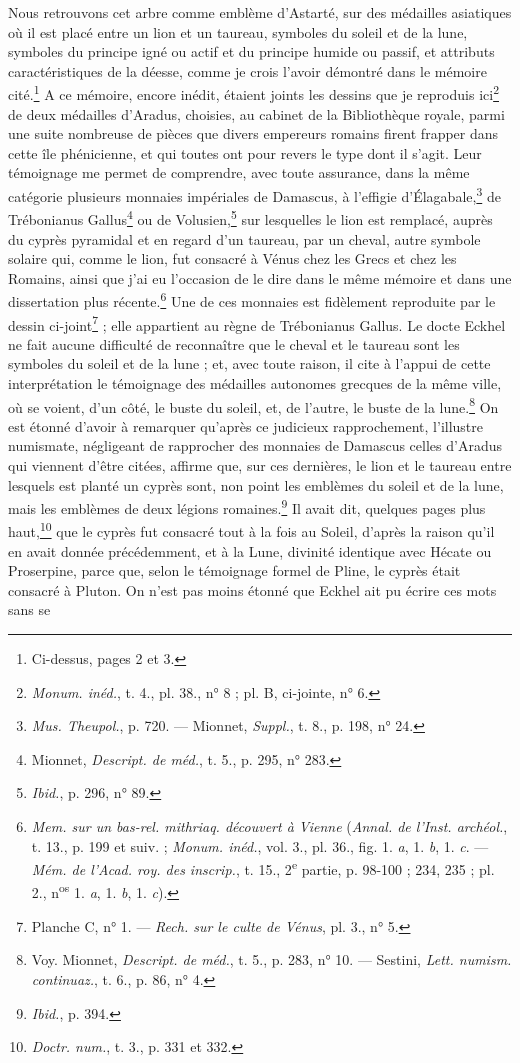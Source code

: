 \documentclass[a4paper, 11pt, oneside, polutonikogreek, french]{article}
\begin{document}
Nous retrouvons cet arbre comme emblème d'Astarté, sur des médailles asiatiques où il est placé entre un lion et un taureau, symboles du soleil et de la lune, symboles du principe igné ou actif et du principe humide ou passif, et attributs caractéristiques de la déesse, comme je crois l'avoir démontré dans le mémoire cité.\footnote{Ci-dessus, pages 2 et 3.} A ce mémoire, encore inédit, étaient joints les dessins que je reproduis ici\footnote{\emph{Monum. inéd.}, t. 4., pl. 38., n° 8 ; pl. B, ci-jointe, n° 6.} de deux médailles d'Aradus, choisies, au cabinet de la Bibliothèque royale, parmi une suite nombreuse de pièces que divers empereurs romains firent frapper dans cette île phénicienne, et qui toutes ont pour revers le type dont il s'agit. Leur témoignage me permet de comprendre, avec toute assurance, dans la même catégorie plusieurs monnaies impériales de Damascus, à l'effigie d'Élagabale,\footnote{\emph{Mus. Theupol.}, p. 720. --- Mionnet, \emph{Suppl.}, t. 8., p. 198, n° 24.} de Trébonianus Gallus\footnote{Mionnet, \emph{Descript. de méd.}, t. 5., p. 295, n° 283.} ou de Volusien,\footnote{\emph{Ibid.}, p. 296, n° 89.} sur lesquelles le lion est remplacé, auprès du cyprès pyramidal et en regard d'un taureau, par un cheval, autre symbole solaire qui, comme le lion, fut consacré à Vénus chez les Grecs et chez les Romains, ainsi que j'ai eu l'occasion de le dire dans le même mémoire et dans une dissertation plus récente.\footnote{\emph{Mem. sur un bas-rel. mithriaq. découvert à Vienne} (\emph{Annal. de l'Inst. archéol.}, t. 13., p. 199 et suiv. ; \emph{Monum. inéd.}, vol. 3., pl. 36., fig. 1. \emph{a}, 1. \emph{b}, 1. \emph{c}. --- \emph{Mém. de l'Acad. roy. des inscrip.}, t. 15., 2\textsuperscript{e} partie, p. 98-100 ; 234, 235 ; pl. 2., n\textsuperscript{os} 1. \emph{a}, 1. \emph{b}, 1. \emph{c}).} Une de ces monnaies est fidèlement reproduite par le dessin ci-joint\footnote{Planche C, n° 1. --- \emph{Rech. sur le culte de Vénus}, pl. 3., n° 5.} ; elle appartient au règne de Trébonianus Gallus. Le docte Eckhel ne fait aucune difficulté de reconnaître que le cheval et le taureau sont les symboles du soleil et de la lune ; et, avec toute raison, il cite à l'appui de cette interprétation le témoignage des médailles autonomes grecques de la même ville, où se voient, d'un côté, le buste du soleil, et, de l'autre, le buste de la lune.\footnote{Voy. Mionnet, \emph{Descript. de méd.}, t. 5., p. 283, n° 10. --- Sestini, \emph{Lett. numism. continuaz.}, t. 6., p. 86, n° 4.} On est étonné d'avoir à remarquer qu'après ce judicieux rapprochement, l'illustre numismate, négligeant de rapprocher des monnaies de Damascus celles d'Aradus qui viennent d'être citées, affirme que, sur ces dernières, le lion et le taureau entre lesquels est planté un cyprès sont, non point les emblèmes du soleil et de la lune, mais les emblèmes de deux légions romaines.\footnote{\emph{Ibid.}, p. 394.} Il avait dit, quelques pages plus haut,\footnote{\emph{Doctr. num.}, t. 3., p. 331 et 332.} que le cyprès fut consacré tout à la fois au Soleil, d'après la raison qu'il en avait donnée précédemment, et à la Lune, divinité identique avec Hécate ou Proserpine, parce que, selon le témoignage formel de Pline, le cyprès était consacré à Pluton. On n'est pas moins étonné que Eckhel ait pu écrire ces mots sans se 
\end{document}
